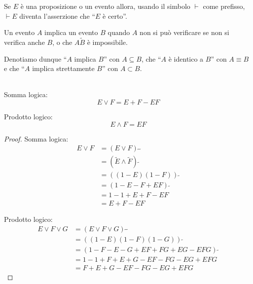 \begin{definition}[Asserzione]\label{def:asserzione}
  Se $E$ è una proposizione o un evento allora, usando il simbolo $\vdash$ come prefisso, \( \vdash E \) diventa l'asserzione che ``$E$ è certo''. 
\end{definition}

\begin{definition}[Implicazione]\label{def:implicazione}
  Un evento $A$ implica un evento $B$ quando $A$ non si può verificare se non si verifica anche $B$, o che \( A\tilde{B} \) è impossibile.

  Denotiamo dunque ``$A$ implica $B$'' con \( A \subseteq B \), che ``$A$ è identico a $B$'' con \( A \equiv B \) e che ``$A$ implica strettamente $B$'' con \( A \subset B \).
\end{definition}

\begin{proposition}{\ \\}
  Somma logica:
  \[ E \vee F = E + F - EF \]

  Prodotto logico:
  \[ E \wedge F = EF \]
\end{proposition}
\begin{proof}
  Somma logica:
  \begin{equation*}
    \begin{split}
      E \vee F &= (E \vee F) ~ \tilde{} ~ \tilde{} \\
      &= (\tilde{E} \wedge \tilde{F}) ~ \tilde{} \\
      &= ((1-E)(1-F)) ~ \tilde{} \\
      &= (1 - E - F + EF) ~ \tilde{} \\
      &= 1 - 1 + E + F - EF \\
      &= E + F - EF
    \end{split}
  \end{equation*}

  Prodotto logico:
  \begin{equation*}
    \begin{split}
      E \vee F \vee G &= (E \vee F \vee G) ~ \tilde{} ~ \tilde{} \\
      &= ((1 - E)(1 - F)(1 - G)) ~ \tilde{} \\
      &= (1 - F - E - G + EF + FG + EG - EFG) ~ \tilde{} \\
      &= 1 - 1 + F + E + G - EF - FG - EG + EFG \\
      &= F + E + G - EF - FG - EG + EFG
    \end{split}
  \end{equation*}
\end{proof}

